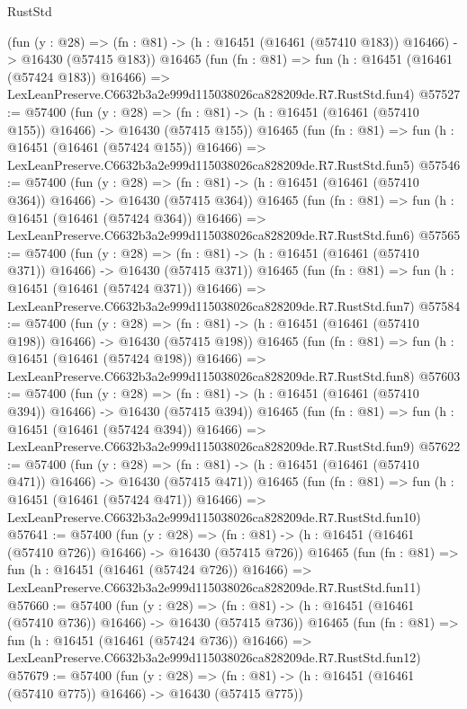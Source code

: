 \begin{lexlean}{RustStd}
\begin{coremodule}
    (fun (y : @28) =>
    (fn : @81) -> (h : @16451 (@16461 (@57410 @183)) @16466) -> @16430 (@57415 @183))
    @16465
    (fun (fn : @81) =>
    fun (h : @16451 (@16461 (@57424 @183)) @16466) =>
    LexLeanPreserve.C6632b3a2e999d115038026ca828209de.R7.RustStd.fun4)
@57527 := @57400
    (fun (y : @28) =>
    (fn : @81) -> (h : @16451 (@16461 (@57410 @155)) @16466) -> @16430 (@57415 @155))
    @16465
    (fun (fn : @81) =>
    fun (h : @16451 (@16461 (@57424 @155)) @16466) =>
    LexLeanPreserve.C6632b3a2e999d115038026ca828209de.R7.RustStd.fun5)
@57546 := @57400
    (fun (y : @28) =>
    (fn : @81) -> (h : @16451 (@16461 (@57410 @364)) @16466) -> @16430 (@57415 @364))
    @16465
    (fun (fn : @81) =>
    fun (h : @16451 (@16461 (@57424 @364)) @16466) =>
    LexLeanPreserve.C6632b3a2e999d115038026ca828209de.R7.RustStd.fun6)
@57565 := @57400
    (fun (y : @28) =>
    (fn : @81) -> (h : @16451 (@16461 (@57410 @371)) @16466) -> @16430 (@57415 @371))
    @16465
    (fun (fn : @81) =>
    fun (h : @16451 (@16461 (@57424 @371)) @16466) =>
    LexLeanPreserve.C6632b3a2e999d115038026ca828209de.R7.RustStd.fun7)
@57584 := @57400
    (fun (y : @28) =>
    (fn : @81) -> (h : @16451 (@16461 (@57410 @198)) @16466) -> @16430 (@57415 @198))
    @16465
    (fun (fn : @81) =>
    fun (h : @16451 (@16461 (@57424 @198)) @16466) =>
    LexLeanPreserve.C6632b3a2e999d115038026ca828209de.R7.RustStd.fun8)
@57603 := @57400
    (fun (y : @28) =>
    (fn : @81) -> (h : @16451 (@16461 (@57410 @394)) @16466) -> @16430 (@57415 @394))
    @16465
    (fun (fn : @81) =>
    fun (h : @16451 (@16461 (@57424 @394)) @16466) =>
    LexLeanPreserve.C6632b3a2e999d115038026ca828209de.R7.RustStd.fun9)
@57622 := @57400
    (fun (y : @28) =>
    (fn : @81) -> (h : @16451 (@16461 (@57410 @471)) @16466) -> @16430 (@57415 @471))
    @16465
    (fun (fn : @81) =>
    fun (h : @16451 (@16461 (@57424 @471)) @16466) =>
    LexLeanPreserve.C6632b3a2e999d115038026ca828209de.R7.RustStd.fun10)
@57641 := @57400
    (fun (y : @28) =>
    (fn : @81) -> (h : @16451 (@16461 (@57410 @726)) @16466) -> @16430 (@57415 @726))
    @16465
    (fun (fn : @81) =>
    fun (h : @16451 (@16461 (@57424 @726)) @16466) =>
    LexLeanPreserve.C6632b3a2e999d115038026ca828209de.R7.RustStd.fun11)
@57660 := @57400
    (fun (y : @28) =>
    (fn : @81) -> (h : @16451 (@16461 (@57410 @736)) @16466) -> @16430 (@57415 @736))
    @16465
    (fun (fn : @81) =>
    fun (h : @16451 (@16461 (@57424 @736)) @16466) =>
    LexLeanPreserve.C6632b3a2e999d115038026ca828209de.R7.RustStd.fun12)
@57679 := @57400
    (fun (y : @28) =>
    (fn : @81) -> (h : @16451 (@16461 (@57410 @775)) @16466) -> @16430 (@57415 @775))

\end{coremodule}
\end{lexlean}
